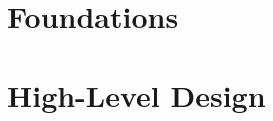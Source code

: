 











\frontmatter
\maketitlepage
\tableofcontents

\mainmatter

\part{Foundations}




\part{High-Level Design}



\backmatter
\printbibliography


